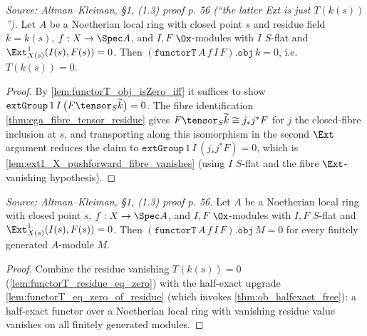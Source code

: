 \begin{lemma}\leanok
[$T(k(s)) = 0$: the residue value of the functor $T$]
  \label{lem:functorT_residue_eq_zero}
  \textit{Source: Altman--Kleiman, §1, (1.3) proof p. 56 (``the latter Ext is just
  $T(k(s))$'').}
  Let $A$ be a Noetherian local ring with closed point $s$ and residue field
  $k = k(s)$, $f : X \to \Spec A$, and $I, F$ $\Ox$-modules with $I$ $S$-flat and
  $\Ext^1_{X(s)}(I(s),F(s)) = 0$. Then $(\texttt{functorT}\,A\,f\,I\,F).\mathtt{obj}\,k = 0$,
  i.e.\ $T(k(s)) = 0$.
  \begin{proof}
    By \cref{lem:functorT_obj_isZero_iff} it suffices to show
    $\mathtt{extGroup}\,1\,I\,\big(F\tensor_S \widetilde k\big) = 0$. The fibre
    identification \cref{thm:ega_fibre_tensor_residue} gives
    $F\tensor_S \widetilde k \cong j_*j^*F$ for $j$ the closed-fibre inclusion at
    $s$, and transporting along this isomorphism in the second $\Ext$ argument
    reduces the claim to $\mathtt{extGroup}\,1\,I\,(j_*j^*F) = 0$, which is
    \cref{lem:ext1_X_pushforward_fibre_vanishes} (using $I$ $S$-flat and the fibre
    $\Ext$-vanishing hypothesis).
  \end{proof}
\end{lemma}

\begin{lemma}\leanok
[$T(M) = 0$ for every finitely generated $A$-module (homological heart at $\Spec A$)]
  \label{lem:functorT_eq_zero}
  \textit{Source: Altman--Kleiman, §1, (1.3) proof p. 56.}
  Let $A$ be a Noetherian local ring with closed point $s$, $f : X \to \Spec A$,
  and $I, F$ $\Ox$-modules with $I, F$ $S$-flat and $\Ext^1_{X(s)}(I(s),F(s)) = 0$.
  Then $(\texttt{functorT}\,A\,f\,I\,F).\mathtt{obj}\,M = 0$ for every finitely
  generated $A$-module $M$.
  \begin{proof}
    Combine the residue vanishing $T(k(s)) = 0$ (\cref{lem:functorT_residue_eq_zero})
    with the half-exact upgrade \cref{lem:functorT_eq_zero_of_residue} (which
    invokes \cref{thm:ob_halfexact_free}): a half-exact functor over a Noetherian
    local ring with vanishing residue value vanishes on all finitely generated
    modules.
  \end{proof}
\end{lemma}

